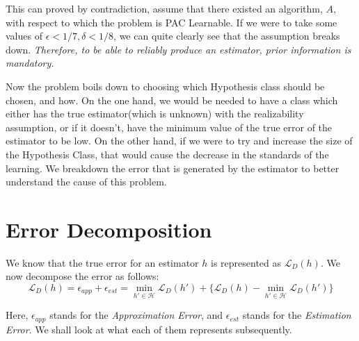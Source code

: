 This can proved by contradiction, assume that there existed an algorithm, $A$, with respect to which the problem is PAC Learnable. If we were to take some values of $\epsilon<1/7, \delta<1/8$, we can quite clearly see that the assumption breaks down. \emph{Therefore, to be able to reliably produce an estimator, prior information is mandatory.}

Now the problem boils down to choosing which Hypothesis class should be chosen, and how. On the one hand, we would be needed to have a class which either has the true estimator(which is unknown) with the realizability assumption, or if it doesn't, have the minimum value of the true error of the estimator to be low. On the other hand, if we were to try and increase the size of the Hypothesis Class, that would cause the decrease in the standards of the learning. We breakdown the error that is generated by the estimator to better understand the cause of this problem.

\section{Error Decomposition}
\label{sec:ed}

We know that the true error for an estimator $h$ is represented as $\mathcal{L}_D(h)$. We now decompose the error as follows:
$$
    \mathcal{L}_D(h) = \epsilon_{app} + \epsilon_{est} = \min\limits_{h'\in\mathcal{H}}\mathcal{L}_D(h') + \{\mathcal{L}_D(h) - \min\limits_{h'\in\mathcal{H}}\mathcal{L}_D(h')\}
$$

Here, $\epsilon_{app}$ stands for the \emph{Approximation Error}, and $\epsilon_{est}$ stands for the \emph{Estimation Error}. We shall look at what each of them represents subsequently.\\

